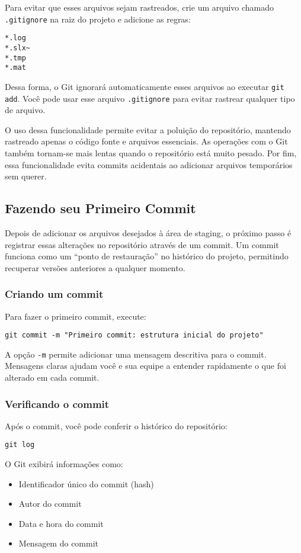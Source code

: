 Para evitar que esses arquivos sejam rastreados, crie um arquivo chamado \texttt{.gitignore} na raiz do projeto e adicione as regras:

\begin{lstlisting}[style=shellstyle]
*.log
*.slx~
*.tmp
*.mat
\end{lstlisting}

Dessa forma, o Git ignorará automaticamente esses arquivos ao executar \texttt{git add}. Você pode usar esse arquivo \texttt{.gitignore} para evitar rastrear qualquer tipo de arquivo. 

O uso dessa funcionalidade permite evitar a poluição do repositório, mantendo rastreado apenas o código fonte e arquivos essenciais. As operações com o Git também tornam-se mais lentas quando o repositório está muito pesado. Por fim, essa funcionalidade evita commits acidentais ao adicionar arquivos temporários sem querer.

\subsection{Fazendo seu Primeiro Commit}

Depois de adicionar os arquivos desejados à área de staging, o próximo passo é registrar essas alterações no repositório através de um commit. Um commit funciona como um “ponto de restauração” no histórico do projeto, permitindo recuperar versões anteriores a qualquer momento.

\subsubsection*{Criando um commit}

Para fazer o primeiro commit, execute:

\begin{lstlisting}[style=shellstyle]
git commit -m "Primeiro commit: estrutura inicial do projeto"
\end{lstlisting}

\noindent
A opção \texttt{-m} permite adicionar uma mensagem descritiva para o commit. Mensagens claras ajudam você e sua equipe a entender rapidamente o que foi alterado em cada commit.

\subsubsection*{Verificando o commit}

Após o commit, você pode conferir o histórico do repositório:

\begin{lstlisting}[style=shellstyle]
git log
\end{lstlisting}

O Git exibirá informações como:
\begin{itemize}
    \item Identificador único do commit (hash)  
    \item Autor do commit  
    \item Data e hora do commit  
    \item Mensagem do commit
\end{itemize}